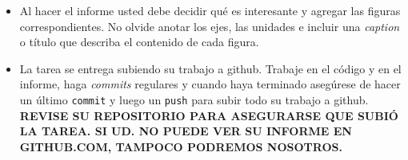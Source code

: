 \documentclass[letter, 11pt]{article}
\begin{document}
\begin{itemize}
\item Al hacer el informe usted debe decidir qué es interesante y agregar las
  figuras correspondientes. No olvide anotar los ejes, las unidades e incluir
  una \emph{caption} o título que describa el contenido de cada figura.

\item La tarea se entrega subiendo su trabajo a github. Trabaje en el código y
  en el informe, haga \textit{commits} regulares y cuando haya terminado
  asegúrese de hacer un último \texttt{commit} y luego un \texttt{push} para
  subir todo su trabajo a github. \textbf{REVISE SU REPOSITORIO PARA ASEGURARSE
  QUE SUBIÓ LA TAREA. SI UD. NO PUEDE VER SU INFORME EN GITHUB.COM, TAMPOCO
PODREMOS NOSOTROS.}

\end{itemize}

\end{document}
